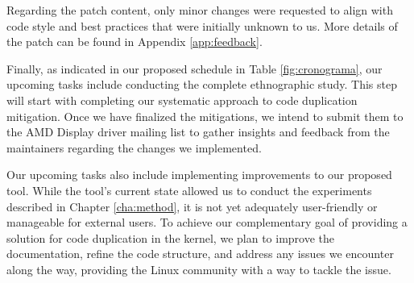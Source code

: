 Regarding the patch content, only minor changes were requested to align with code 
style and best practices that were initially unknown to us. More details of the 
patch can be found in Appendix \ref{app:feedback}.



Finally, as indicated in our proposed schedule in Table \ref{fig:cronograma}, 
our upcoming tasks include conducting the complete ethnographic study.
This step will start with completing our systematic approach to code 
duplication mitigation. Once we have finalized the mitigations, we intend 
to submit them to the AMD Display driver mailing list to gather insights 
and feedback from the maintainers regarding the changes we implemented.

Our upcoming tasks also include implementing improvements to our proposed tool. 
While the tool’s current state allowed us to conduct the experiments described in 
Chapter \ref{cha:method},
it is not yet adequately user-friendly or manageable for external users. 
To achieve our complementary goal of providing a solution for code duplication 
in the kernel, we plan to improve the documentation, refine the code structure, 
and address any issues we encounter along the way, providing the Linux community 
with a way to tackle the issue.

